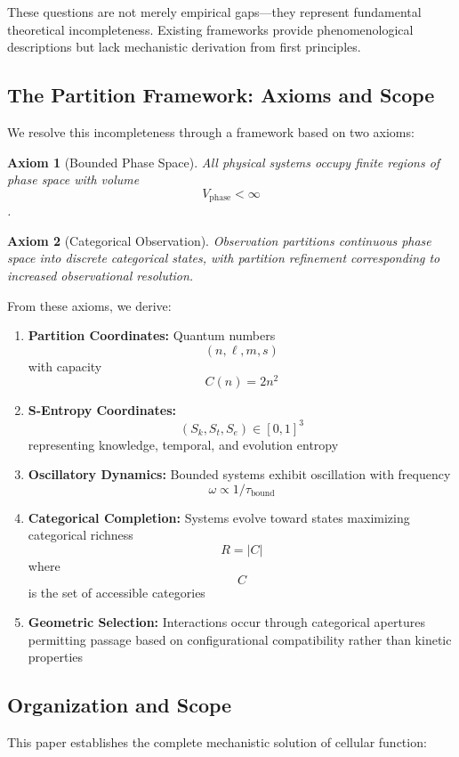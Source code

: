 \documentclass[12pt,a4paper]{article}
\newtheorem{axiom}{Axiom}
\begin{document}
These questions are not merely empirical gaps—they represent fundamental theoretical incompleteness. Existing frameworks provide phenomenological descriptions but lack mechanistic derivation from first principles.

\subsection{The Partition Framework: Axioms and Scope}

We resolve this incompleteness through a framework based on two axioms:

\begin{axiom}[Bounded Phase Space]
All physical systems occupy finite regions of phase space with volume $$V_{\text{phase}} < \infty$$.
\end{axiom}

\begin{axiom}[Categorical Observation]
Observation partitions continuous phase space into discrete categorical states, with partition refinement corresponding to increased observational resolution.
\end{axiom}

From these axioms, we derive:

\begin{enumerate}
\item \textbf{Partition Coordinates:} Quantum numbers $$(n, \ell, m, s)$$ with capacity $$C(n) = 2n^2$$
\item \textbf{S-Entropy Coordinates:} $$(S_k, S_t, S_e) \in [0,1]^3$$ representing knowledge, temporal, and evolution entropy
\item \textbf{Oscillatory Dynamics:} Bounded systems exhibit oscillation with frequency $$\omega \propto 1/\tau_{\text{bound}}$$
\item \textbf{Categorical Completion:} Systems evolve toward states maximizing categorical richness $$R = |C|$$ where $$C$$ is the set of accessible categories
\item \textbf{Geometric Selection:} Interactions occur through categorical apertures permitting passage based on configurational compatibility rather than kinetic properties
\end{enumerate}

\subsection{Organization and Scope}

This paper establishes the complete mechanistic solution of cellular function:
\end{document}
